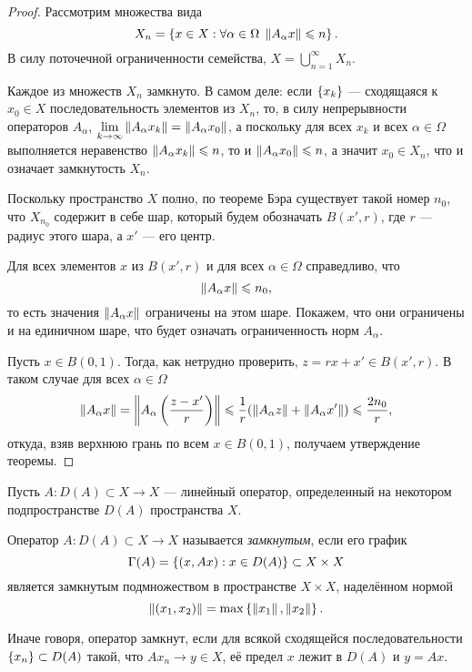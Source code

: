 \begin{proof}
    Рассмотрим множества вида
    \[ X_n = \left\{x \in X : \forall \alpha \in \Omega \; \left\|A_\alpha x\right\| \leqslant n\right\}. \]
    В силу поточечной ограниченности семейства, $X = \bigcup\limits_{n=1}^\infty X_n$.

    Каждое из множеств $X_n$ замкнуто. В самом деле: если $\left\{x_k\right\}$ ---
    сходящаяся к $x_0 \in X$ последовательность элементов из $X_n$, то, в силу непрерывности
    операторов $A_\alpha$, $\lim\limits_{k\to\infty}\left\|A_\alpha x_k\right\|
    =\left\|A_\alpha x_0\right\|$, а поскольку для всех $x_k$ и всех $\alpha \in \Omega$
    выполняется неравенство $\left\|A_\alpha x_k\right\| \leqslant n$, то и $\left\|A_\alpha
    x_0\right\| \leqslant n$, а значит $x_0 \in X_n$, что и означает замкнутость $X_n$.

    Поскольку пространство $X$ полно, по теореме Бэра существует такой номер
    $n_0$, что $X_{n_0}$ содержит в себе шар, который будем 
    обозначать $B(x', r)$, где $r$ --- радиус этого шара, а
    $x'$ --- его центр.

    Для всех элементов $x$ из $B(x', r)$ и для всех $\alpha \in \Omega$ справедливо, что
    \[ \left\|A_\alpha x\right\| \leqslant n_0, \]
    то есть значения $\left\|A_\alpha x\right\|$ ограничены на этом шаре. Покажем, что они
    ограничены и на единичном шаре, что будет означать ограниченность норм
    $A_\alpha$. 
    
    Пусть $x \in B(0, 1)$. Тогда, как нетрудно
    проверить, $z = rx + x' \in B(x', r)$. В таком случае для всех $\alpha \in
    \Omega$
    \[ \left\|A_{\alpha} x\right\| = \left\|A_{\alpha} \left( \frac{z - x'}{r}
    \right)\right\|\leqslant \frac{1}{r} (\left\|A_\alpha z\right\| + \left\|A_\alpha x'\right\|) \leqslant
    \frac{2n_0}{r}, \]
    откуда, взяв верхнюю грань по всем $x \in B(0, 1)$, получаем утверждение
    теоремы.
\end{proof}

Пусть $A \colon D(A) \subset X \to X$ --- линейный оператор, определенный на некотором
подпространстве $D(A)$ пространства $X$.

\begin{definition}
    Оператор $A \colon D(A) \subset X \to X$ называется \emph{замкнутым}, если его график
    \[ \Gamma(A) = \left\{(x, Ax) : x \in D(A)\right\} \subset X \times X \]
    является замкнутым подмножеством в пространстве $X \times X$, наделённом нормой
    \[ \left\|(x_1, x_2)\right\| = \max\left\{\left\|x_1\right\|, \left\|x_2\right\|\right\}. \]
\end{definition}

Иначе говоря, оператор замкнут,
если для всякой сходящейся последовательности $\left\{x_n\right\} \subset D(A)$ такой, что
$Ax_n \to y \in X$, её предел $x$ лежит в $D(A)$ и $y = Ax$.

